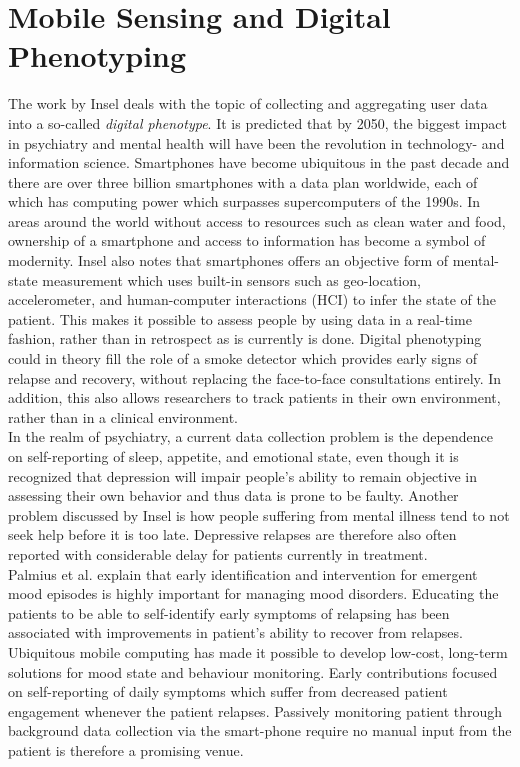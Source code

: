 \section{Mobile Sensing and Digital Phenotyping}
The work by Insel \cite{digital_phenotyping} deals with the topic of collecting and aggregating user data into a so-called \textit{digital phenotype}. It is predicted that by 2050, the biggest impact in psychiatry and mental health will have been the revolution in technology- and information science. Smartphones have become ubiquitous in the past decade and there are over three billion smartphones with a data plan worldwide, each of which has computing power which surpasses supercomputers of the 1990s. In areas around the world without access to resources such as clean water and food, ownership of a smartphone and access to information has become a symbol of modernity. Insel also notes that smartphones offers an objective form of mental-state measurement which uses built-in sensors such as geo-location, accelerometer, and human-computer interactions (HCI) to infer the state of the patient. This makes it possible to assess people by using data in a real-time fashion, rather than in retrospect as is currently is done. Digital phenotyping could in theory fill the role of a smoke detector which provides early signs of relapse and recovery, without replacing the face-to-face consultations entirely. In addition, this also allows researchers to track patients in their own environment, rather than in a clinical environment.\\

In the realm of psychiatry, a current data collection problem is the dependence on self-reporting of sleep, appetite, and emotional state, even though it is recognized that depression will impair people's ability to remain objective in assessing their own behavior and thus data is prone to be faulty. Another problem discussed by Insel is how people suffering from mental illness tend to not seek help before it is too late. Depressive relapses are therefore also often reported with considerable delay for patients currently in treatment.  \\

Palmius et al. \cite{palmius2017} explain that early identification and intervention for emergent mood episodes is highly important for managing mood disorders. Educating the patients to be able to self-identify early symptoms of relapsing has been associated with improvements in patient's ability to recover from relapses. Ubiquitous mobile computing has made it possible to develop low-cost, long-term solutions for mood state and behaviour monitoring. Early contributions focused on self-reporting of daily symptoms which suffer from decreased patient engagement whenever the patient relapses. Passively monitoring patient through background data collection via the smart-phone require no manual input from the patient is therefore a promising venue.